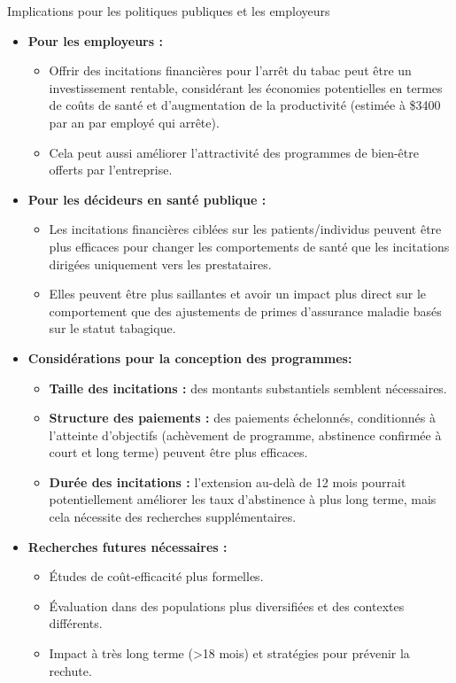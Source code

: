 \documentclass[aspectratio=169,xcolor=dvipsnames]{beamer}
\begin{document}
\begin{frame}{Implications pour les politiques publiques et les employeurs}
    \begin{itemize}
        \item \textbf{Pour les employeurs :}
            \begin{itemize}
                \item Offrir des incitations financières pour l'arrêt du tabac peut être un investissement rentable, considérant les économies potentielles en termes de coûts de santé et d'augmentation de la productivité (estimée à \$3400 par an par employé qui arrête).
                \item Cela peut aussi améliorer l'attractivité des programmes de bien-être offerts par l'entreprise.
            \end{itemize}
        \item \textbf{Pour les décideurs en santé publique :}
            \begin{itemize}
                \item Les incitations financières ciblées sur les patients/individus peuvent être plus efficaces pour changer les comportements de santé que les incitations dirigées uniquement vers les prestataires.
                \item Elles peuvent être plus saillantes et avoir un impact plus direct sur le comportement que des ajustements de primes d'assurance maladie basés sur le statut tabagique.
            \end{itemize}
        \item \textbf{Considérations pour la conception des programmes:}
            \begin{itemize}
                \item \textbf{Taille des incitations :} des montants substantiels semblent nécessaires.
                \item \textbf{Structure des paiements :} des paiements échelonnés, conditionnés à l'atteinte d'objectifs (achèvement de programme, abstinence confirmée à court et long terme) peuvent être plus efficaces.
                \item \textbf{Durée des incitations :} l'extension au-delà de 12 mois pourrait potentiellement améliorer les taux d'abstinence à plus long terme, mais cela nécessite des recherches supplémentaires.
            \end{itemize}
        \item \textbf{Recherches futures nécessaires :}
            \begin{itemize}
                \item Études de coût-efficacité plus formelles.
                \item Évaluation dans des populations plus diversifiées et des contextes différents.
                \item Impact à très long terme (>18 mois) et stratégies pour prévenir la rechute.
            \end{itemize}
    \end{itemize}
\end{frame}
\end{document}
